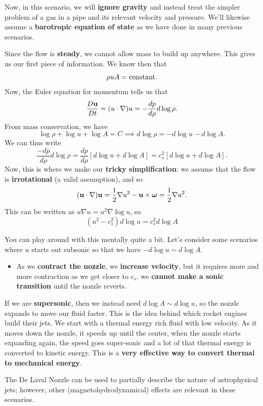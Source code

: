 Now, in this scenario, we will \textbf{ignore gravity} and instead treat the simpler problem of a gas in a pipe and its relevant velocity and pressure. We'll likewise assume a \textbf{barotropic equation of state} as we have done in many previous scenarios.
\par
Since the flow is \textbf{steady}, we cannot allow mass to build up anywhere. This gives us our first piece of information. We know then that
\[
\rho u A = \rm{constant.}
\]
Now, the Euler equation for momentum tells us that
\[
\frac{D{\bf u}}{Dt} = (u\cdot\nabla)u = - \frac{dp}{d\rho} d\log \rho.
\]
From mass conservation, we have
\[
\log \rho + \log u + \log A = C \implies d\log \rho = - d\log u - d\log A.
\]
We can thus write
\[
\frac{-dp}{d\rho} d\log \rho = \frac{dp}{d\rho}\left[d\log u + d\log A\right] = c_s^2[d\log u + d\log A].
\]
Now, this is where we make our \textbf{tricky simplification}: we assume that the flow is \textbf{irrotational} (a valid assumption), and so
\[
({\bf u} \cdot \nabla){\bf u} = \frac{1}{2}\nabla u^2 - {\bf u} \times \boldsymbol{\omega} = \frac{1}{2}\nabla u^2.
\]
This can be written as $u \nabla u = u^2 \nabla \log u$, so
\[
\boxed{
(u^2-c_s^2) d\log u = c_s^2 d\log A
}
\]
\begin{remark}
    You can play around with this mentally quite a bit. Let's consider some scenarios where $u$ starts out subsonic so that we have $- d\log u \sim d\log A$. 
    \begin{itemize}
        \item As we \textbf{contract the nozzle}, we \textbf{increase velocity}, but it requires more and more contraction as we get closer to $c_s$. we \textbf{cannot make a sonic transition} until the nozzle reverts.
    \end{itemize}

If we are \textbf{supersonic}, then we instead need $d\log A \sim d\log u$, so the nozzle expands to move our fluid faster. This is the idea behind which rocket engines build their jets. We start with a thermal energy rich fluid with low velocity. As it moves down the nozzle, it speeds up until the center, when the nozzle starts expanding again, the speed goes super-sonic and a lot of that thermal energy is converted to kinetic energy. This is a \textbf{very effective way to convert thermal to mechanical energy}.
\end{remark}
The De Laval Nozzle can be used to partially describe the nature of astrophysical jets; however, other (magnetohydrodynamical) effects are relevant in these scenarios.

